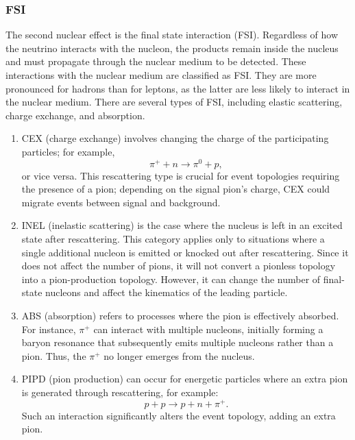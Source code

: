 \subsubsection{FSI}
\label{sec:nuint-fsi}
The second nuclear effect is the final state interaction (FSI).
Regardless of how the neutrino interacts with the nucleon, the products remain inside the nucleus and must propagate through the nuclear medium to be detected.
These interactions with the nuclear medium are classified as FSI.
They are more pronounced for hadrons than for leptons, as the latter are less likely to interact in the nuclear medium.
There are several types of FSI, including elastic scattering, charge exchange, and absorption.
\begin{enumerate}
  \item 
  CEX (charge exchange) involves changing the charge of the participating particles; for example,
  \begin{equation}
      \pi^+ + n \rightarrow \pi^0 + p,
  \end{equation}
  or vice versa. This rescattering type is crucial for event topologies requiring the presence of a pion; depending on the signal pion’s charge, CEX could migrate events between signal and background. 

  \item 
  INEL (inelastic scattering) is the case where the nucleus is left in an excited state after rescattering. This category applies only to situations where a single additional nucleon is emitted or knocked out after rescattering. Since it does not affect the number of pions, it will not convert a pionless topology into a pion-production topology. However, it can change the number of final-state nucleons and affect the kinematics of the leading particle.

  \item 
  ABS (absorption) refers to processes where the pion is effectively absorbed. For instance, $\pi^+$ can interact with multiple nucleons, initially forming a baryon resonance that subsequently emits multiple nucleons rather than a pion. Thus, the $\pi^+$ no longer emerges from the nucleus.

  \item 
  PIPD (pion production) can occur for energetic particles where an extra pion is generated through rescattering, for example:
  \begin{equation}
      p + p \rightarrow p + n + \pi^+.
  \end{equation}
  Such an interaction significantly alters the event topology, adding an extra pion.
\end{enumerate}

